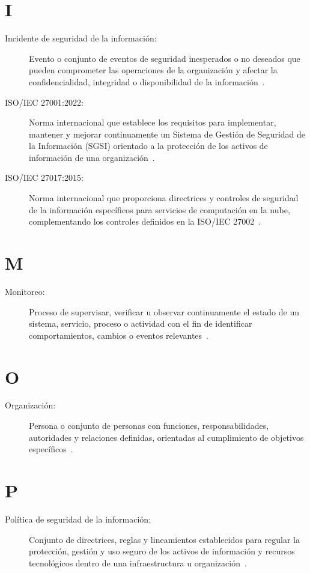\section*{I}
\begin{description}
	\item[Incidente de seguridad de la información:] Evento o conjunto de eventos de seguridad inesperados o no deseados que pueden comprometer las operaciones de la organización y afectar la confidencialidad, integridad o disponibilidad de la información~\cite{ISO27000Glossary}.
	
	\item[ISO/IEC 27001:2022:] Norma internacional que establece los requisitos para implementar, mantener y mejorar continuamente un Sistema de Gestión de Seguridad de la Información (SGSI) orientado a la protección de los activos de información de una organización~\cite{ISO27000Glossary}.
	
	\item[ISO/IEC 27017:2015:] Norma internacional que proporciona directrices y controles de seguridad de la información específicos para servicios de computación en la nube, complementando los controles definidos en la ISO/IEC 27002~\cite{iso27017}.
\end{description}

\section*{M}
\begin{description}
	\item[Monitoreo:] Proceso de supervisar, verificar u observar continuamente el estado de un sistema, servicio, proceso o actividad con el fin de identificar comportamientos, cambios o eventos relevantes~\cite{ISO27000Glossary}.
\end{description}

\section*{O}
\begin{description}
	\item[Organización:]  Persona o conjunto de personas con funciones, responsabilidades, autoridades y relaciones definidas, orientadas al cumplimiento de objetivos específicos~\cite{ISO27000Glossary}.
\end{description}

\section*{P}
\begin{description}
	\item[Política de seguridad de la información:] Conjunto de directrices, reglas y lineamientos establecidos para regular la protección, gestión y uso seguro de los activos de información y recursos tecnológicos dentro de una infraestructura u organización~\cite{iso27001}.
\end{description}


